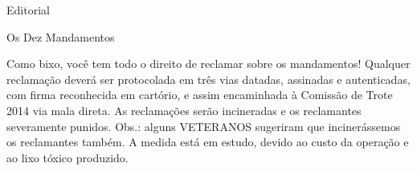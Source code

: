 \begin{secao}{Editorial}
\begin{subsecao}{Os Dez Mandamentos}
  
Como bixo, você tem todo o direito de reclamar sobre os mandamentos! Qualquer
reclamação deverá ser protocolada em três vias datadas, assinadas e autenticadas,
com firma reconhecida em cartório, e assim encaminhada à Comissão de Trote 2014 %
via mala direta. As reclamações serão incineradas e os reclamantes severamente
punidos. Obs.: alguns VETERANOS sugeriram que incinerássemos os reclamantes também.
A medida está em estudo, devido ao custo da operação e ao lixo tóxico produzido.


\end{subsecao}
\end{secao}
